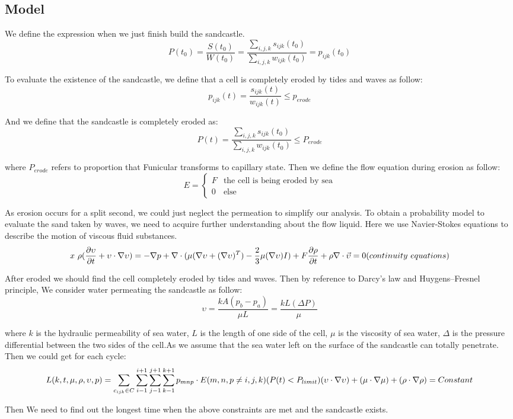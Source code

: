 \documentclass[12pt]{article}
\begin{document}
\subsection{Model}
We define the expression when we just finish build the sandcastle.
$$  P(t_0) = \frac{S(t_0)}{W(t_0)} = \frac{\sum_{i,j,k}s_{ijk}(t_0)}{\sum_{i,j,k}w_{ijk}(t_0)} = p_{ijk}(t_0) $$
\par
To evaluate the existence of the sandcastle, we define that a cell is completely eroded by tides and waves as follow:
$$  p_{ijk}(t) = \frac{s_{ijk}(t)}{w_{ijk}(t)} \leq p_{erode} $$
\par
And we define that the sandcastle is completely eroded as:
$$  P(t) = \frac{\sum_{i,j,k}s_{ijk}(t_0)}{\sum_{i,j,k}w_{ijk}(t_0)} \leq P_{erode} $$
\par
where $P_{erode}$ refers to proportion that Funicular transforms to capillary state. Then we define the flow equation during erosion as follow:
$$	E=
    \begin{cases}
        F & \text{the cell is being eroded by sea} \\
        0 & \text{else}
    \end{cases}
$$
\par
As erosion occurs for a split second, we could just neglect the permeation to simplify our analysis. To obtain a probability model to evaluate the sand taken by waves, we need to acquire further understanding about the flow liquid. Here we use Navier-Stokes equations to describe the motion of viscous fluid substances.
$$
    x \rho(\frac{\partial \upsilon}{\partial t} + \upsilon \cdot \nabla \upsilon) = -\nabla p + \nabla \cdot(\mu(\nabla \upsilon+(\nabla \upsilon)^T)-\frac{2}{3}\mu(\nabla \upsilon)I)+F\\\frac{\partial \rho}{\partial t}+\rho\nabla\cdot\vec{\upsilon}=0(continuity \ equations)
$$
\par
After eroded we should find the cell completely eroded by tides and waves. Then by reference to Darcy's law and Huygens–Fresnel principle, We consider water permeating the sandcastle as follow:
$$
    \upsilon=\frac{kA(p_b-p_a)}{\mu L}=\frac{kL(\Delta P)}{\mu}
$$
\par
where $k$ is the hydraulic permeability of sea water, $L$ is the length of one side of the cell, $\mu$ is the viscosity of sea water, $\Delta$ is the pressure differential between the two sides of the cell.As we assume that the sea water left on the surface of the sandcastle can totally penetrate. Then we could get for each cycle:
$$
    L (k,t,\mu,\rho,\upsilon,p)=\sum_{c_{ijk}\in C}\sum_{i-1}^{i+1}\sum_{j-1}^{j+1}\sum_{k-1}^{k+1}{p_{mnp}\cdot E}(m,n,p \neq i,j,k)(P(t) <P_{limit})\\
    (\upsilon \cdot \nabla \upsilon)+(\mu \cdot \nabla \mu)+(\rho \cdot \nabla \rho) = Constant
$$
\par
Then We need to find out the longest time when the above constraints are met and the sandcastle exists.
\end{document}
